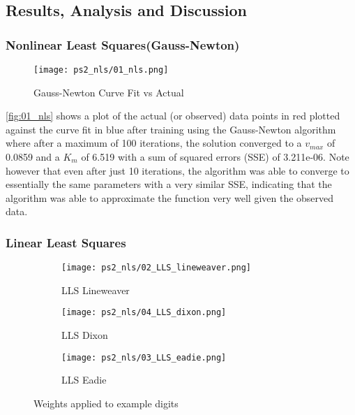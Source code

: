 \documentclass{article} %
\theoremstyle{definition}
\theoremstyle{remark}
\theoremstyle{plain}
\begin{document}
\subsection{Results, Analysis and Discussion}

\subsubsection{Nonlinear Least Squares(Gauss-Newton)}
\begin{figure}[h!]
    \centering
    \texttt{[image: ps2\_nls/01\_nls.png]}
    \caption{Gauss-Newton Curve Fit vs Actual}
    \label{fig:01_nls}
\end{figure}

\autoref{fig:01_nls} shows a plot of the actual (or observed) data points in red plotted against the curve fit in blue after training using the Gauss-Newton algorithm where after a maximum of 100 iterations, the solution converged to a $v_{max}$ of 0.0859 and a $K_m$ of 6.519 with a sum of squared errors (SSE) of 3.211e-06. Note however that even after just 10 iterations, the algorithm was able to converge to essentially the same parameters with a very similar SSE, indicating that the algorithm was able to approximate the function very well given the observed data.

\subsubsection{Linear Least Squares}

\begin{figure}[h!]
\centering
    \begin{subfigure}{.33\textwidth}
        \centering
        \texttt{[image: ps2\_nls/02\_LLS\_lineweaver.png]}
        \caption{LLS Lineweaver}
        \label{fig:02_LLS_lineweaver}
    \end{subfigure}
    \begin{subfigure}{.33\textwidth}
        \centering
        \texttt{[image: ps2\_nls/04\_LLS\_dixon.png]}
        \caption{LLS Dixon}
        \label{fig:04_LLS_dixon}
    \end{subfigure}%
    \begin{subfigure}{.33\textwidth}
        \centering
        \texttt{[image: ps2\_nls/03\_LLS\_eadie.png]}
        \caption{LLS Eadie}
        \label{fig:03_LLS_eadie}
    \end{subfigure}%
\caption{Weights applied to example digits}
\label{fig:lls_3_plots}
\end{figure}
\end{document}
